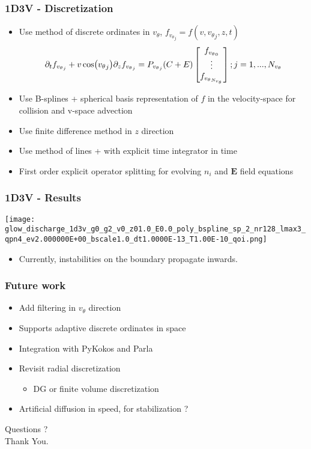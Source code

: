 \documentclass[mathserif, aspectratio=169]{beamer}
\newcommand{\vect}[1]{\boldsymbol{#1}}
\newcommand{\of}[1]{\mleft( #1 \mright)}
\newcommand{\vtheta}{{v_{\theta}}}
\begin{document}
\begin{frame}
	\frametitle{1D3V - Discretization}
	\begin{itemize}
		\item Use method of discrete ordinates in $\vtheta$, $f_{\vtheta_j} = f(v, \vtheta_j, z, t)$
		\begin{align}
			\partial_t f_{\vtheta_j} + v\cos\of{\vtheta_j} \partial_z f_{\vtheta_j} = P_{\vtheta_j} (C + E) \begin{bmatrix}
				f_{\vtheta_0}\\
				\vdots\\
				f_{\vtheta_{N_\vtheta}}\\
			\end{bmatrix} ; j=1,..., N_{\vtheta}
		\end{align}
		\item Use B-splines + spherical basis representation of $f$ in the velocity-space for collision and v-space advection
		\item Use finite difference method in $z$ direction
		\item Use method of lines + with explicit time integrator in time
		\item First order explicit operator splitting for evolving $n_i$ and $\vect{E}$ field equations
	\end{itemize}
\end{frame}

\begin{frame}
	\frametitle{1D3V - Results}
	\begin{center}
		\texttt{[image: glow\_discharge\_1d3v\_g0\_g2\_v0\_z01.0\_E0.0\_poly\_bspline\_sp\_2\_nr128\_lmax3\_qpn4\_ev2.000000E+00\_bscale1.0\_dt1.0000E-13\_T1.00E-10\_qoi.png]}
	\end{center}
	\begin{itemize}
		\item Currently, instabilities on the boundary propagate inwards.
	\end{itemize}
\end{frame}

\begin{frame}
	\frametitle{Future work}
	\begin{itemize}
		\item Add filtering in $\vtheta$ direction
		\item Supports adaptive discrete ordinates in space
		\item Integration with PyKokos and Parla
		\item Revisit radial discretization
		\begin{itemize}
			\item DG or finite volume discretization
		\end{itemize}
		\item Artificial diffusion in speed, for stabilization ?
	\end{itemize}
\end{frame}

\begin{frame}
	\centering
	\Huge Questions ? \\
	\centering
	\Huge Thank You. 
\end{frame}
\end{document}
